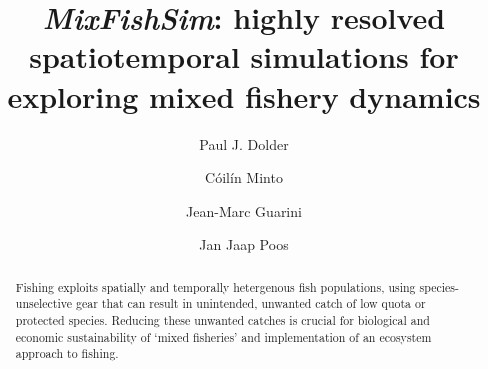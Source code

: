 \documentclass[review]{elsarticle}
\begin{document}
\begin{frontmatter}
\title{\emph{MixFishSim}: highly resolved spatiotemporal simulations for
	exploring mixed fishery dynamics}


\author[1,2]{Paul J. Dolder}

\author[1]{Cóilín Minto}
\author[3]{Jean-Marc Guarini}
\author[4]{Jan Jaap Poos}

\address[1]{Galway-Mayo Institute of Technology (GMIT), Dublin Road, Galway,
	Ireland} 
\address[2]{Centre for Environment, Fisheries and Aquaculture Science (Cefas),
	Pakefield Road, Lowestoft, UK}
\address[3]{Université Pierre et Marie Curie, 4 Place Jussieu, 75005 Paris,
	France}
\address[4]{Wageningen Marine Research, Haringkade 1 1976 CP IJmuiden,
	Netherlands}

\begin{abstract}
%
Fishing exploits spatially and temporally hetergenous fish populations, using
species-unselective gear that can result in unintended, unwanted catch of low
quota or protected species. Reducing these unwanted catches is crucial for
biological and economic sustainability of `mixed fisheries' and implementation
of an ecosystem approach to fishing. \\


\end{abstract}
\end{frontmatter}
\end{document}
